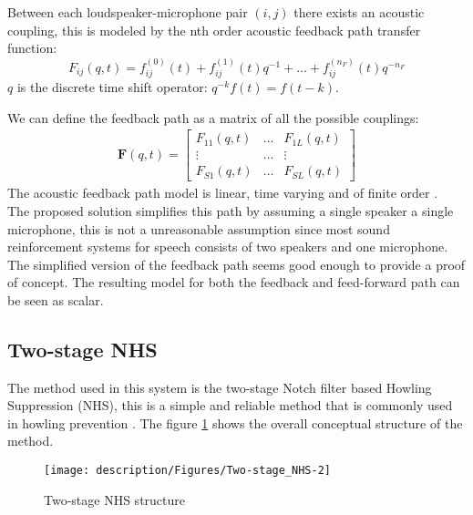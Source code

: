 Between each loudspeaker-microphone pair $(i,j)$ there exists an acoustic coupling, this is modeled by the nth order acoustic feedback path transfer function:
\begin{equation}
	F_{ij}(q,t) = f_{ij}^{(0)}(t) + f_{ij}^{(1)}(t)q^{-1} + \ldots + f_{ij}^{(n_F)}(t)q^{-n_F}
\end{equation}
$q$ is the discrete time shift operator: $q^{-k}f(t) = f(t-k)$.

We can define the feedback path as a matrix of all the possible couplings:
\begin{eqnarray}
\mathbf{F}(q,t) =
\begin{bmatrix}
F_{11}(q,t) & \ldots & F_{1L}(q,t)\\
\vdots & \ldots & \vdots\\
F_{S1}(q,t) & \ldots & F_{SL}(q,t)
\end{bmatrix}
\end{eqnarray}
The acoustic feedback path model is linear, time varying and of finite order \cite{van_waterschoot_fifty_2011}.\\

The proposed solution simplifies this path by assuming a single speaker a single microphone, this is not a unreasonable assumption since most sound reinforcement systems for speech consists of two speakers and one microphone. The simplified version of the feedback path seems good enough to provide a proof of concept. The resulting model for both the feedback and feed-forward path can be seen as scalar.\\

\subsection{Two-stage NHS}
The method used in this system is the two-stage Notch filter based Howling Suppression (NHS), this is a simple and reliable method that is commonly used in howling prevention \cite{van_waterschoot_fifty_2011}. The figure \ref{NHS_overview} shows the overall conceptual structure of the method.

\begin{figure}[H]
\centering
\texttt{[image: description/Figures/Two-stage\_NHS-2]}
\caption{Two-stage NHS structure}
\label{NHS_overview}
\end{figure}

